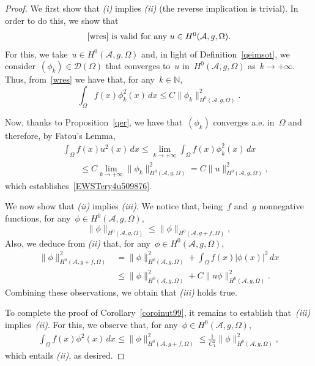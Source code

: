 \documentclass[11pt,hyp,]{nyjm}
\numberwithin{equation}{section}
\newcommand{\N}{\mathbb{N}}
\theoremstyle{remark}
\newcommand{\am}{\mathcal{A}}
\renewcommand{\leq}{\leqslant}
\renewcommand{\le}{\leqslant}
\begin{document}
\begin{proof}
We first show that \textit{(i)} implies \textit{(ii)} (the reverse implication is trivial). 
In order to do this, we show that
\begin{equation}\label{EWSTery4u509876}
{\mbox{\eqref{wres} is valid for any~$u \in H^0(\am, g, \Omega )$.}}\end{equation}
For this, we take~$u \in H^0(\am, g, \Omega )$ and, in light of
Definition~\ref{qeimsot},
we consider~$(\phi_k) \in \mathcal{D}(\Omega)$ that converges to~$u$ in~$H^0(\am, g, \Omega )$ as~$k\to+\infty$.
Thus, from~\eqref{wres} we have that, for any~$k\in\N$,
$$
\int_{\Omega} f(x) \phi_k^2(x) \, dx \leq C \| \phi_k\|^2_{H^0(\am, g, \Omega )}.
$$

Now, thanks to Proposition~\ref{qer}, we have that~$(\phi_k)$ converges a.e. in~$\Omega$ and therefore, by Fatou's Lemma,
\begin{eqnarray*}&& \int_{\Omega} f(x) u^2(x) \, dx\le
\lim_{k\to+\infty}\int_{\Omega} f(x) \phi_k^2(x) \, dx \\&&\qquad\leq C \lim_{k\to+\infty}\| \phi_k\|^2_{H^0(\am, g, \Omega )} =C\|u\|^2_{H^0(\am, g, \Omega )} ,
\end{eqnarray*} which establishes~\eqref{EWSTery4u509876}.

We now show that \textit{(ii)} implies \textit{(iii)}. We notice that, being~$f$ and~$g$
nonnegative functions, for any~$\phi  \in H^0(\am, g, \Omega )$,
\begin{equation*}
\|\phi\|_{H^{0}(\mathcal{A}, g, \Omega)} \leq \| \phi\|_{H^{0}(\mathcal{A}, g+f, \Omega)}, 
\end{equation*}				
Also, we deduce from \textit{(ii)} that, for any~$\phi  \in H^0(\am, g, \Omega )$,
			\begin{equation*}\begin{split}
\| \phi\|^2_{H^{0}(\mathcal{A}, g+f, \Omega)} &= \| \phi\|^2_{H^{0}(\mathcal{A}, g, \Omega)} + \int_{\Omega} f(x) |\phi(x)|^2 \,dx\\&\leq 
 \| \phi\|^2_{H^{0}(\mathcal{A}, g, \Omega)} +C\|u\phi\|_{H^{0}(\mathcal{A}, g, \Omega)}^2.\end{split}
\end{equation*}
Combining these observations, we obtain that \textit{(iii)} holds true.

To complete the proof of Corollary~\ref{coroinut99}, it remains to establish
that~\textit{(iii)} implies~\textit{(ii)}.
For this, we observe that, for any~$\phi \in H^0(\am, g, \Omega )$,
\begin{eqnarray*}
\int_{\Omega} f(x) \phi^2(x) \, dx \le \| \phi\|^2_{H^{0}(\mathcal{A}, g+f, \Omega)}\le
\frac1{C_1^2}\| \phi\|^2_{H^{0}(\mathcal{A}, g, \Omega)},
\end{eqnarray*}
which entails \textit{(ii)}, as desired.
\end{proof}
\end{document}
